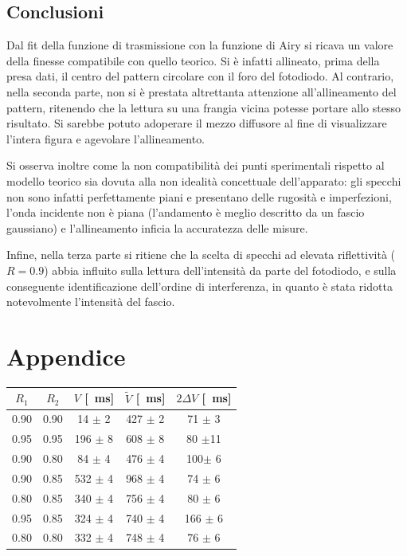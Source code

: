 \documentclass[10pt,oneside,a4paper]{article}
\begin{document}
\begin{multicols}{2}
\section{Conclusioni}
Dal fit della funzione di trasmissione con la funzione di Airy si ricava un valore della finesse compatibile con quello teorico. Si è infatti allineato, prima della presa dati, il centro del pattern circolare con il foro del fotodiodo. Al contrario, nella seconda parte, non si è prestata altrettanta attenzione all'allineamento del pattern, ritenendo che la lettura su una frangia vicina potesse portare allo stesso risultato. Si sarebbe potuto adoperare il mezzo diffusore al fine di visualizzare l'intera figura e agevolare l'allineamento.

Si osserva inoltre come la non compatibilità dei punti sperimentali rispetto al modello teorico sia dovuta alla non idealità concettuale dell'apparato: gli specchi non sono infatti perfettamente piani e presentano delle rugosità e imperfezioni, l'onda incidente non è piana (l'andamento è meglio descritto da un fascio gaussiano) e l'allineamento inficia la accuratezza delle misure.

Infine, nella terza parte si ritiene che la scelta di specchi ad elevata riflettività ($R=0.9$) abbia influito sulla lettura dell'intensità da parte del fotodiodo, e sulla conseguente identificazione dell'ordine di interferenza, in quanto è stata ridotta notevolmente l'intensità del fascio.

\end{multicols}


\newpage
\section{Appendice}



\begin{center}
\label{tab:parte_due}
\begin{tabular}{c|c|c|c|c}
$R_1$ & $R_2$ & $V$\footnotemark{} [\SI{}{ms}] & $\tilde V$ [\SI{}{ms}] & $2\Delta V$ [\SI{}{ms}]\\
\hline
 0.90 & 0.90 &  14 $\pm$ 2 & 427 $\pm$  2 &  71 $\pm$  3 \\
 0.95 & 0.95 & 196 $\pm$ 8 & 608 $\pm$ 8 &  80  $\pm$11 \\
 0.90 & 0.80 &  84 $\pm$ 4 & 476 $\pm$  4 & 100$\pm$   6 \\
 0.90 & 0.85 & 532 $\pm$ 4 & 968 $\pm$ 4 &  74  $\pm$ 6 \\
 0.80 & 0.85 & 340 $\pm$ 4 & 756 $\pm$ 4 &  80  $\pm$ 6 \\
 0.95 & 0.85 & 324 $\pm$ 4 & 740 $\pm$ 4 & 166 $\pm$  6 \\
 0.80 & 0.80 & 332 $\pm$ 4 & 748 $\pm$ 4 &  76  $\pm$ 6 \\
\hline
\end{tabular}
\end{center}
\end{document}
